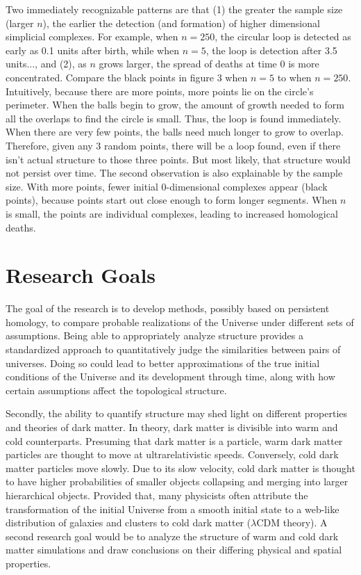 \documentclass[12pt]{article}
\begin{document}
Two immediately recognizable patterns are that (1) the greater the sample size (larger $n$), the earlier the detection (and formation) of higher dimensional simplicial complexes. For example, when $n = 250$, the circular loop is detected as early as 0.1 units after birth, while when $n = 5$, the loop is detection after 3.5 units..., and (2), as $n$ grows larger, the spread of deaths at time 0 is more concentrated. Compare the black points in figure 3 when $n = 5$ to when $n = 250$. Intuitively, because there are more points, more points lie on the circle's perimeter. When the balls begin to grow, the amount of growth needed to form all the overlaps to find the circle is small. Thus, the loop is found immediately. When there are very few points, the balls need much longer to grow to overlap. Therefore, given any 3 random points, there will be a loop found, even if there isn't actual structure to those three points. But most likely, that structure would not persist over time. The second observation is also explainable by the sample size. With more points, fewer initial 0-dimensional complexes appear (black points), because points start out close enough to form longer segments. When $n$ is small, the points are individual complexes, leading to increased homological deaths.

\section{Research Goals}
The goal of the research is to develop methods, possibly based on persistent homology, to compare probable realizations of the Universe under different sets of assumptions. Being able to appropriately analyze structure provides a standardized approach to quantitatively judge the similarities between pairs of universes. Doing so could lead to better approximations of the true initial conditions of the Universe and its development through time, along with how certain assumptions affect the topological structure.

Secondly, the ability to quantify structure may shed light on different properties and theories of dark matter. In theory, dark matter is divisible into warm and cold counterparts. Presuming that dark matter is a particle, warm dark matter particles are thought to move at ultrarelativistic speeds. Conversely, cold dark matter particles move slowly. Due to its slow velocity, cold dark matter is thought to have higher probabilities of smaller objects collapsing and merging into larger hierarchical objects. Provided that, many physicists often attribute the transformation of the initial Universe from a smooth initial state to a web-like distribution of galaxies and clusters to cold dark matter ($\lambda$CDM theory). A second research goal would be to analyze the structure of warm and cold dark matter simulations and draw conclusions on their differing physical and spatial properties. 
\end{document}
